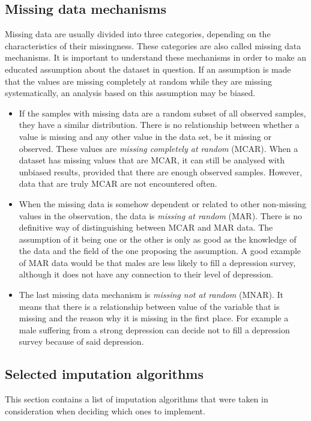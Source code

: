 \documentclass[11pt]{article}
\begin{document}
    \subsection{Missing data mechanisms}
      Missing data are usually divided into three categories, depending on the characteristics of their missingness. These categories are also called missing data mechanisms.\cite{lwd} It is important to understand these mechanisms in order to make an educated assumption about the dataset in question. If an assumption is made that the values are missing completely at random while they are missing systematically, an analysis based on this assumption may be biased.
      \begin{itemize}
      \item If the samples with missing data are a random subset of all observed samples, they have a similar distribution. There is no relationship between whether a value is missing and any other value in the data set, be it missing or observed. These values are {\it missing completely at random} (MCAR).\cite{lwd} When a dataset has missing values that are MCAR, it can still be analysed with unbiased results, provided that there are enough observed samples. However, data that are truly MCAR are not encountered often.
      \item When the missing data is somehow dependent or related to other non-missing values in the observation, the data is {\it missing at random} (MAR).\cite{lwd} There is no definitive way of distinguishing between MCAR and MAR data. The assumption of it being one or the other is only as good as the knowledge of the data and the field of the one proposing the assumption. A good example of MAR data would be that males are less likely to fill a depression survey, although it does not have any connection to their level of depression.
      \item The last missing data mechanism is {\it missing not at random} (MNAR). It means that there is a relationship between value of the variable that is missing and the reason why it is missing in the first place. For example a male suffering from a strong depression can decide not to fill a depression survey because of said depression.
      \end{itemize}
    \subsection{Selected imputation algorithms}
      This section contains a list of imputation algorithms that were taken in consideration when deciding which ones to implement.
\end{document}
